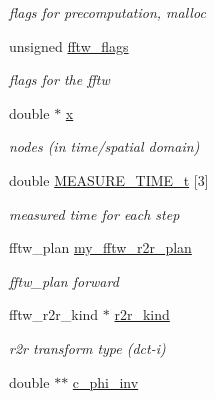\begin{CompactItemize}
\begin{CompactList}\small\item\em flags for precomputation, malloc \item\end{CompactList}\item 
\hypertarget{structnfst__plan_o12}{
unsigned \hyperlink{structnfst__plan_o12}{fftw\_\-flags}}
\label{structnfst__plan_o12}

\begin{CompactList}\small\item\em flags for the fftw \item\end{CompactList}\item 
\hypertarget{structnfst__plan_o13}{
double $\ast$ \hyperlink{structnfst__plan_o13}{x}}
\label{structnfst__plan_o13}

\begin{CompactList}\small\item\em nodes (in time/spatial domain) \item\end{CompactList}\item 
\hypertarget{structnfst__plan_o14}{
double \hyperlink{structnfst__plan_o14}{MEASURE\_\-TIME\_\-t} \mbox{[}3\mbox{]}}
\label{structnfst__plan_o14}

\begin{CompactList}\small\item\em measured time for each step \item\end{CompactList}\item 
\hypertarget{structnfst__plan_o15}{
fftw\_\-plan \hyperlink{structnfst__plan_o15}{my\_\-fftw\_\-r2r\_\-plan}}
\label{structnfst__plan_o15}

\begin{CompactList}\small\item\em fftw\_\-plan forward \item\end{CompactList}\item 
\hypertarget{structnfst__plan_o16}{
fftw\_\-r2r\_\-kind $\ast$ \hyperlink{structnfst__plan_o16}{r2r\_\-kind}}
\label{structnfst__plan_o16}

\begin{CompactList}\small\item\em r2r transform type (dct-i) \item\end{CompactList}\item 
\hypertarget{structnfst__plan_o17}{
double $\ast$$\ast$ \hyperlink{structnfst__plan_o17}{c\_\-phi\_\-inv}}
\label{structnfst__plan_o17}


\end{CompactItemize}
